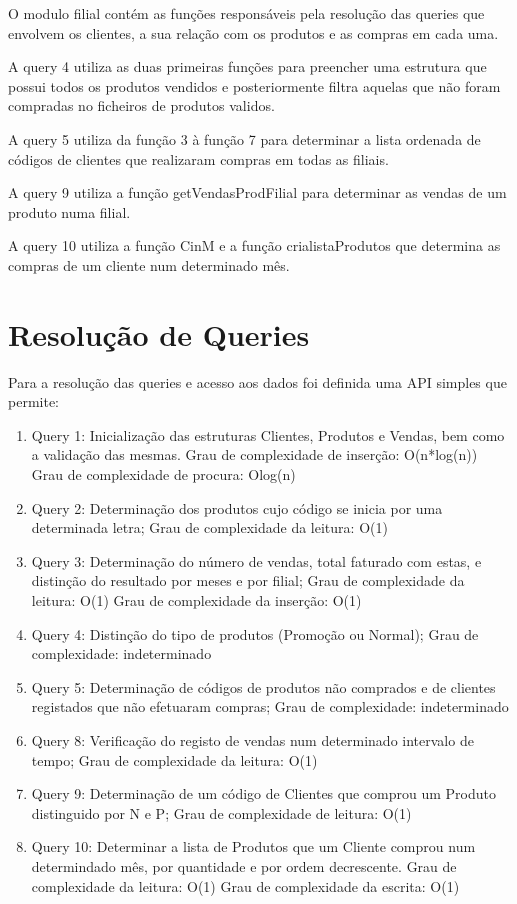 \documentclass[a4paper]{report} %
\begin{document}
\par 


\par O modulo filial contém as funções responsáveis pela resolução das queries que envolvem os clientes, a sua relação com os produtos e as compras em cada uma. 
\par A query 4 utiliza as duas primeiras funções para preencher uma estrutura que possui todos os produtos vendidos e posteriormente filtra aquelas que não foram compradas no ficheiros de produtos validos.
\par A query 5 utiliza da função 3 à função 7 para determinar a lista ordenada de códigos de clientes que realizaram compras em todas as filiais. 
\par A query 9 utiliza a função getVendasProdFilial para determinar as vendas de um produto numa filial.
\par A query 10 utiliza a função CinM e a função crialistaProdutos que determina as compras de um cliente num determinado mês.

\chapter{Resolução de Queries}
Para a resolução das queries e acesso aos dados foi definida uma API
    simples que permite:
    \begin{enumerate}
        \item Query 1: Inicialização das estruturas Clientes, Produtos e Vendas, bem como a validação das mesmas.
        Grau de complexidade de inserção: O(n*log(n))
        Grau de complexidade de procura: Olog(n)
        \item Query 2: Determinação dos produtos cujo código se inicia por uma determinada letra;
        Grau de complexidade da leitura: O(1)
        \item Query 3: Determinação do número de vendas, total faturado com estas, e distinção do resultado por meses e por filial;
        Grau de complexidade da leitura: O(1)
        Grau de complexidade da inserção: O(1)
         \item Query 4: Distinção do tipo de produtos (Promoção ou Normal);
         Grau de complexidade: indeterminado
        \item Query 5: Determinação de códigos de produtos não comprados e de clientes registados que não efetuaram compras;
        Grau de complexidade: indeterminado
        \item Query 8: Verificação do registo de vendas num determinado intervalo de tempo;
        Grau de complexidade da leitura: O(1)
        \item Query 9: Determinação de um código de Clientes que comprou um Produto distinguido por N e P;
        Grau de complexidade de leitura: O(1)
        \item Query 10: Determinar a lista de Produtos que um Cliente comprou num determindado mês, por quantidade e por ordem decrescente.
        Grau de complexidade da leitura: O(1)
        Grau de complexidade da escrita: O(1)
    \end{enumerate}
\end{document}
